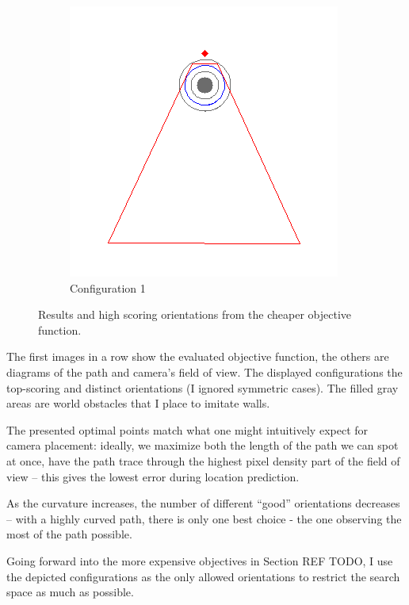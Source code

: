 \documentclass[a4paper,12pt,twoside,openright]{report}
\begin{document}
\begin{figure}[h!]
\begin{subfigure}[b]{0.45\textwidth}
    \includegraphics[width=\textwidth]{figures/simple_objective/radius_5m_pos1_small.png}
    \caption{Configuration 1}
\end{subfigure}
\caption[Cheaper Objective Function Results]{Results and high scoring orientations from the cheaper objective function.}
\label{fig:simpleobjective}
\end{figure}

The first images in a row show the evaluated objective function, the others
are diagrams of the path and camera's field of view. The displayed
configurations the top-scoring and distinct orientations (I ignored
symmetric cases). The filled gray areas are world obstacles
that I place to imitate walls.

The presented optimal points match what one might intuitively expect 
for camera placement: ideally, we maximize both the length of the path
we can spot at once, have the path trace through the highest
pixel density part of the field of view -- this gives the lowest
error during location prediction.

As the curvature increases, the number of different ``good'' 
orientations decreases -- with a highly curved path, there is only
one best choice - the one observing the most of the path possible.

Going forward into the more expensive objectives in Section REF TODO, I use
the depicted configurations as the only allowed orientations to restrict
the search space as much as possible.
\end{document}
